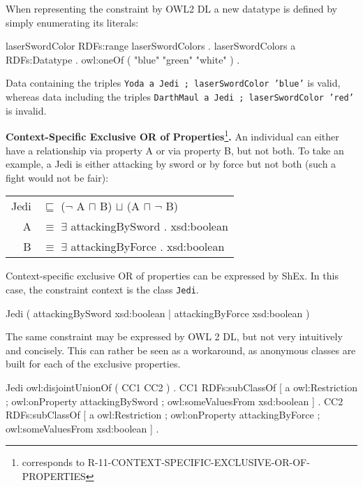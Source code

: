 \documentclass{llncs}
\newcommand{\ms}[1]{\texttt{#1}}
\newenvironment{DL}{
  \vspace{0cm}
  \begin{tabular}{r l}

}{
  \end{tabular}
}
\begin{document}
When representing the constraint by OWL2 DL a new datatype is defined by simply enumerating its literals:

\begin{ex}
laserSwordColor RDFs:range laserSwordColors . 
laserSwordColors
    a RDFs:Datatype .
    owl:oneOf ( "blue" "green" "white" ) .
\end{ex}

Data containing the triples \ms{Yoda a Jedi ; laserSwordColor 'blue'} is valid, 
whereas data including the triples \ms{DarthMaul a Jedi ; laserSwordColor 'red'} is invalid.

\textbf{Context-Specific Exclusive OR of Properties}\footnote{corresponds to  R-11-CONTEXT-SPECIFIC-EXCLUSIVE-OR-OF-PROPERTIES}\textbf{.}
An individual can either have a relationship via property A or via property B, but not both.
To take an example, a Jedi is either attacking by sword or by force but not both (such a fight would not be fair):

\begin{center}
\begin{DL}
Jedi &$\sqsubseteq$ ($\neg$ A $\sqcap$ B) $\sqcup$ (A $\sqcap$ $\neg$ B) \\
A &$\equiv$ $\exists$ attackingBySword . xsd:boolean \\
B &$\equiv$ $\exists$ attackingByForce . xsd:boolean \\ 
\end{DL} 
\end{center}

Context-specific exclusive OR of properties can be expressed by ShEx. 
In this case, the constraint context is the class \ms{Jedi}.

\begin{ex}
Jedi { (  
    attackingBySword xsd:boolean | 
    attackingByForce xsd:boolean ) }
\end{ex}

The same constraint may be expressed by OWL 2 DL, but not very intuitively and concisely.
This can rather be seen as a workaround, as anonymous classes are built for each of the exclusive properties.

\begin{ex}
Jedi owl:disjointUnionOf ( CC1 CC2 ) . 
CC1 RDFs:subClassOf [
    a owl:Restriction ;
    owl:onProperty attackingBySword ;
    owl:someValuesFrom xsd:boolean ] .
CC2 RDFs:subClassOf [
    a owl:Restriction ;
    owl:onProperty attackingByForce ;
    owl:someValuesFrom xsd:boolean ] .
\end{ex}
\end{document}
